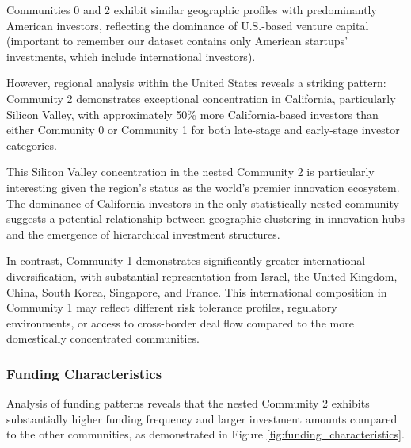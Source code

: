 
Communities 0 and 2 exhibit similar geographic profiles with predominantly American investors, reflecting the dominance of U.S.-based venture capital (important to remember our dataset contains only American startups' investments, which include international investors). 

However, regional analysis within the United States reveals a striking pattern: Community 2 demonstrates exceptional concentration in California, particularly Silicon Valley, with approximately 50\% more California-based investors than either Community 0 or Community 1 for both late-stage and early-stage investor categories.

This Silicon Valley concentration in the nested Community 2 is particularly interesting given the region's status as the world's premier innovation ecosystem. The dominance of California investors in the only statistically nested community suggests a potential relationship between geographic clustering in innovation hubs and the emergence of hierarchical investment structures. 


In contrast, Community 1 demonstrates significantly greater international diversification, with substantial representation from Israel, the United Kingdom, China, South Korea, Singapore, and France. This international composition in Community 1 may reflect different risk tolerance profiles, regulatory environments, or access to cross-border deal flow compared to the more domestically concentrated communities.

\subsubsection{Funding Characteristics}

Analysis of funding patterns reveals that the nested Community 2 exhibits substantially higher funding frequency and larger investment amounts compared to the other communities, as demonstrated in Figure \ref{fig:funding_characteristics}.

